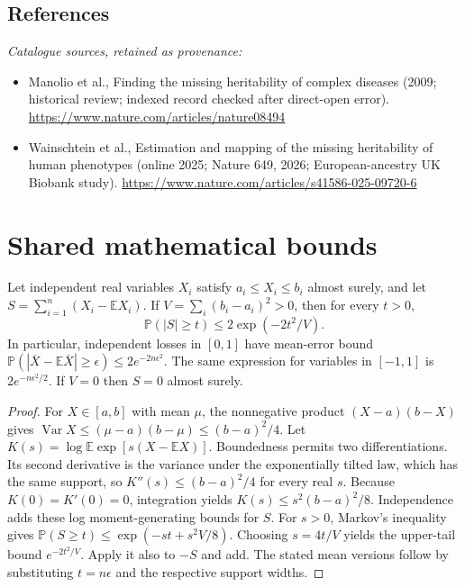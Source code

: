 \documentclass[11pt]{article}
\begin{document}
\subsection{References}
\noindent\emph{Catalogue sources, retained as provenance:}
\begin{itemize}
\item Manolio et al., Finding the missing heritability of complex diseases (2009; historical review; indexed record checked after direct-open error). \url{https://www.nature.com/articles/nature08494}
\item Wainschtein et al., Estimation and mapping of the missing heritability of human phenotypes (online 2025; Nature 649, 2026; European-ancestry UK Biobank study). \url{https://www.nature.com/articles/s41586-025-09720-6}
\end{itemize}




\section{Shared mathematical bounds}\label{app:bounds}
\begin{lemma}\label{lem:bounded}
Let independent real variables $X_i$ satisfy $a_i\leq X_i\leq b_i$ almost surely,
and let $S=\sum_{i=1}^n(X_i-\mathbb{E} X_i)$. If
$V=\sum_i(b_i-a_i)^2>0$, then for every $t>0$,
\[
 \mathbb{P}(|S|\geq t)\leq 2\exp(-2t^2/V).
\]
In particular, independent losses in $[0,1]$ have mean-error bound
$\mathbb{P}(|\overline X-\mathbb{E}\overline X|\geq\epsilon)
\leq2e^{-2n\epsilon^2}$. The same expression for variables in $[-1,1]$
is $2e^{-n\epsilon^2/2}$. If $V=0$ then $S=0$ almost surely.
\end{lemma}
\begin{proof}
For $X\in[a,b]$ with mean $\mu$, the nonnegative product
$(X-a)(b-X)$ gives
$\operatorname{Var} X\leq(\mu-a)(b-\mu)\leq(b-a)^2/4$.
Let $K(s)=\log\mathbb{E}\exp[s(X-\mathbb{E} X)]$.
Boundedness permits two differentiations. Its second derivative is the variance
under the exponentially tilted law, which has the same support, so
$K''(s)\leq(b-a)^2/4$ for every real $s$.
Because $K(0)=K'(0)=0$, integration yields
$K(s)\leq s^2(b-a)^2/8$.
Independence adds these log moment-generating bounds for $S$.
For $s>0$, Markov's inequality gives
$\mathbb{P}(S\geq t)\leq\exp(-st+s^2V/8)$.
Choosing $s=4t/V$ yields the upper-tail bound $e^{-2t^2/V}$.
Apply it also to $-S$ and add. The stated mean versions follow by substituting
$t=n\epsilon$ and the respective support widths.
\end{proof}
\end{document}
